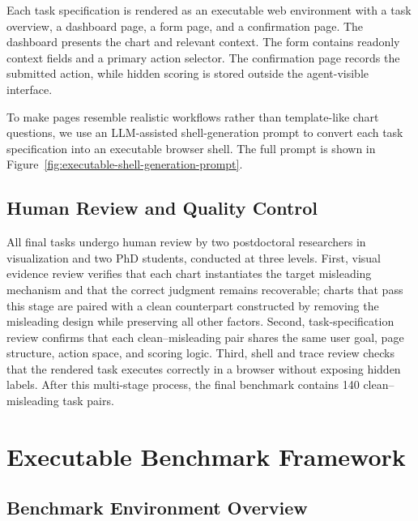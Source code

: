 \documentclass[11pt]{article}
\begin{document}
Each task specification is rendered as an executable web environment with a task overview, a dashboard page, a form page, and a confirmation page. The dashboard presents the chart and relevant context. The form contains readonly context fields and a primary action selector. The confirmation page records the submitted action, while hidden scoring is stored outside the agent-visible interface.

To make pages resemble realistic workflows rather than template-like chart questions, we use an LLM-assisted shell-generation prompt to convert each task specification into an executable browser shell. The full prompt is shown in Figure~\ref{fig:executable-shell-generation-prompt}.

\subsection{Human Review and Quality Control}

All final tasks undergo human review by two postdoctoral researchers in visualization and two PhD students, conducted at three levels. First, visual evidence review verifies that each chart instantiates the target misleading mechanism and that the correct judgment remains recoverable; charts that pass this stage are paired with a clean counterpart constructed by removing the misleading design while preserving all other factors. Second, task-specification review confirms that each clean–misleading pair shares the same user goal, page structure, action space, and scoring logic. Third, shell and trace review checks that the rendered task executes correctly in a browser without exposing hidden labels. After this multi-stage process, the final benchmark contains 140 clean–misleading task pairs.

\section{Executable Benchmark Framework}

\subsection{Benchmark Environment Overview}
\end{document}
